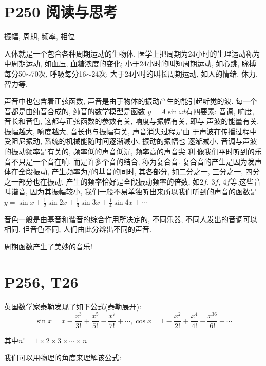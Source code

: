 \documentclass{book}
\begin{document}
    \section{\textcolor[rgb]{0.11,0.65,0.52}{P250 阅读与思考}}

    \begin{center}
        振幅, 周期, 频率, 相位
    \end{center}

    人体就是一个包合各种周期运动的生物体, 医学上把周期为24小时的生理运动称为中周期运动, 如血压, 血糖浓度的变化; 小于24小时的叫短周期运动,  如心跳, 脉搏每分50$\sim$70次, 呼吸每分16$\sim$24次; 大于24小时的叫长周期运动, 如人的情绪, 休力, 智力等.

    声音中也包含着正弦函数, 声音是由于物体的振动产生的能引起听觉的波. 每一个音都是由纯音合成的, 纯音的数学模型是函数 $y=A\sin \omega t$有四要素:  音调, 响度, 音长和音色, 这都与正弦函数的参数有关, 响度与振幅有关, 即与 声波的能量有关, 振幅越大, 响度越大, 音长也与振幅有关, 声音消失过程是由 于声波在传播过程中受阻尼振动, 系统的机械能随时间逐渐减小, 振动的振幅也 逐渐减小, 音调与声波的振动频率是有关的, 频率低的声音低沉, 频率高的声音尖
    利.像我们平时听到的乐音不只是一个音在响, 而是许多个音的结合, 称为复合音.  复合音的产生是因为发声体在全段振动, 产生频率为/的基音的同时, 其各部分,  如二分之一, 三分之一, 四分之一部分也在振动, 产生的频率恰好是全段振动频率的倍数, 如2$f$, 3$f$, 4$f$等.这些音叫谐音, 因为其振幅较小, 我们一般不易单独听出来所以我们听到的声音的函数是$\displaystyle y=\sin x+\frac{1}{2}\sin 2x+\frac{1}{3}\sin 3x+\frac{1}{4}\sin 4x+\cdots$

    音色一般是由基音和谐音的综合作用所决定的, 不同乐器, 不同人发出的音调可以相同, 但音色不同, 人们由此分辨出不同的声音.

    周期函数产生了美妙的音乐!

    \section{\textcolor[rgb]{0.11,0.65,0.52}{P256, T26}}
    英国数学家泰勒发现了如下公式\textcolor[rgb]{0.38,0.11,0.2}{(泰勒展开)}:
    $$
        \sin x = x - \frac{x^3}{3!}+\frac{x^5}{5!}-\frac{x^7}{7!}+\cdots,
        \cos x = 1-\frac{x^2}{2!}+\frac{x^4}{4!}-\frac{x^36}{6!}+\cdots
    $$

    其中$n!=1\times2\times3\times\cdots\times n$

    我们可以用\textcolor[rgb]{0.75,0.17,0.22}{物理的角度}来理解该公式:
\end{document}
